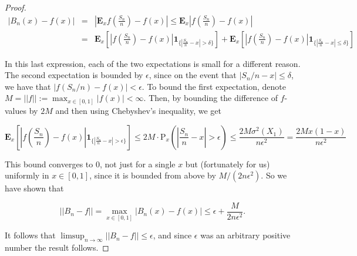\begin{proof}
\begin{eqnarray*}
|B_n(x)-f(x)| &=& \left|\mathbf{E}_x f\left(\frac{S_n}{n}\right)-f(x)\right| \le \mathbf{E}_x \left|f\left(\frac{S_n}{n}\right)-f(x)\right| \\
&=& \mathbf{E}_x \left[\left|f\left(\frac{S_n}{n}\right)-f(x)\right|\mathbf{1}_{\{ \left|\frac{S_n}{n}-x\right|>\delta \}}\right] +
\mathbf{E}_x \left[\left|f\left(\frac{S_n}{n}\right)-f(x)\right|\mathbf{1}_{\{ \left|\frac{S_n}{n}-x\right|\le\delta \}}\right]
\end{eqnarray*}

\noindent In this last expression, each of the two expectations
is small for a different reason. The second
expectation is bounded by $\epsilon$, since on the
event that $|S_n/n-x|\le \delta$, we have that
$|f(S_n/n)-f(x)|<\epsilon$. To bound the first
expectation, denote
$M=||f||:=\max_{x\in[0,1]}|f(x)|<\infty$. Then, by
bounding the difference of $f$-values by $2M$ and
then using Chebyshev's inequality, we get

\[
\mathbf{E}_x \left[\left|f\left(\frac{S_n}{n}\right)-f(x)\right|\mathbf{1}_{\{ \left|\frac{S_n}{n}-x\right|>\epsilon \}} \right]
\le 2M\cdot \mathrm{P}_x\left( \left|\frac{S_n}{n}-x\right|>\epsilon\right)
\le \frac{2 M \sigma^2(X_1)}{n \epsilon^2} = \frac{2 M x(1-x)}{n\epsilon^2}
\]

\noindent This bound converges to $0$, not just for a single $x$
but (fortunately for us) uniformly in $x\in[0,1]$,
since it is bounded from above by $M/(2n\epsilon^2)$.
So we have shown that

\[
||B_n-f|| = \max_{x\in[0,1]} |B_n(x)-f(x)| \le
\epsilon + \frac{M}{2n\epsilon^2}.
\]

\noindent It follows that
$\limsup_{n\to\infty} ||B_n-f|| \le \epsilon$, and
since $\epsilon$ was an arbitrary positive number the
result follows.
\end{proof}

